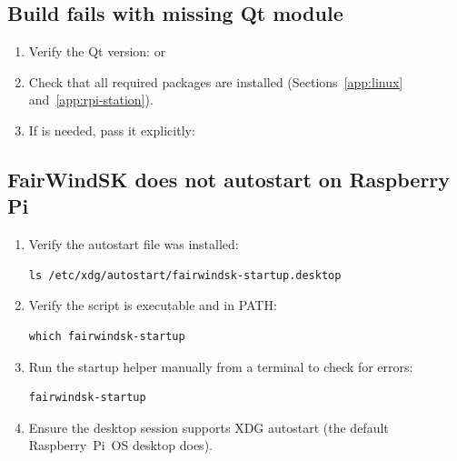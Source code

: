 \subsection{Build fails with missing Qt module}

\begin{enumerate}
  \item Verify the Qt version:  or
  \item Check that all required packages are installed
        (Sections~\ref{app:linux} and~\ref{app:rpi-station}).
  \item If  is needed, pass it explicitly:
\end{enumerate}

\subsection{FairWindSK does not autostart on Raspberry Pi}

\begin{enumerate}
  \item Verify the autostart file was installed:
\begin{lstlisting}
ls /etc/xdg/autostart/fairwindsk-startup.desktop
\end{lstlisting}
  \item Verify the  script is executable
        and in PATH:
\begin{lstlisting}
which fairwindsk-startup
\end{lstlisting}
  \item Run the startup helper manually from a terminal to check for errors:
\begin{lstlisting}
fairwindsk-startup
\end{lstlisting}
  \item Ensure the desktop session supports XDG autostart
        (the default Raspberry~Pi~OS desktop does).
\end{enumerate}
